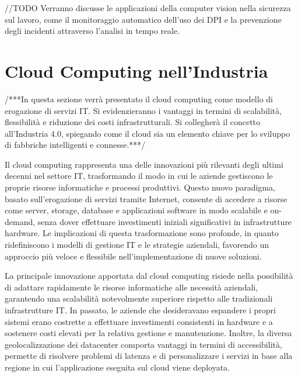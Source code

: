 //TODO Verranno discusse le applicazioni della computer vision nella sicurezza sul lavoro, come il monitoraggio automatico dell'uso dei DPI e la prevenzione degli incidenti attraverso l'analisi in tempo reale.

\section{Cloud Computing nell'Industria}

/***In questa sezione verrà presentato il cloud computing come modello di erogazione di servizi IT. Si evidenzieranno i vantaggi in termini di scalabilità, flessibilità e riduzione dei costi infrastrutturali. Si collegherà il concetto all'Industria 4.0, spiegando come il cloud sia un elemento chiave per lo sviluppo di fabbriche intelligenti e connesse.***/

Il cloud computing rappresenta una delle innovazioni più rilevanti degli ultimi decenni nel settore IT, trasformando il modo in cui le aziende gestiscono le proprie risorse informatiche e processi produttivi. Questo nuovo paradigma, basato sull’erogazione di servizi tramite Internet, consente di accedere a risorse come server, storage, database e applicazioni software in modo scalabile e on-demand, senza dover effettuare investimenti iniziali significativi in infrastrutture hardware. Le implicazioni di questa trasformazione sono profonde, in quanto ridefiniscono i modelli di gestione IT e le strategie aziendali, favorendo un approccio più veloce e flessibile nell’implementazione di nuove soluzioni.

La principale innovazione apportata dal cloud computing risiede nella possibilità di adattare rapidamente le risorse informatiche alle necessità aziendali, garantendo una scalabilità notevolmente superiore rispetto alle tradizionali infrastrutture IT. In passato, le aziende che desideravano espandere i propri sistemi erano costrette a effettuare investimenti consistenti in hardware e a sostenere costi elevati per la relativa gestione e manutenzione. Inoltre, la diversa geolocalizzazione dei datacenter comporta vantaggi in termini di accessibilità, permette di risolvere problemi di latenza e di personalizzare i servizi in base alla regione in cui l'applicazione eseguita sul cloud viene deployata. 


